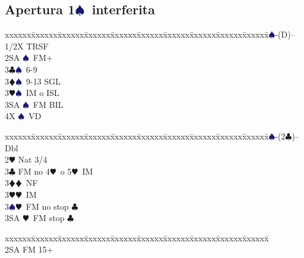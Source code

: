 \documentclass[a4paper,italian]{article}
\newcommand{\BC}{\textcolor{OliveGreen}{$\clubsuit$}}
\newcommand{\BD}{\textcolor{RedOrange}{$\vardiamondsuit$}}
\newcommand{\BH}{\textcolor{Red2}{$\varheartsuit${}}}
\newcommand{\BS}{\textcolor{MidnightBlue}{$\spadesuit${}}}
\newcommand{\pdfs}{\texorpdfstring{\BS{}}{S}}
\newenvironment{bidtable}
{\begin{tabbing}

    xxxxxx\=xxxxxx\=xxxxxx\=xxxxxx\=xxxxxx\=xxxxxx\=xxxxxx\=xxxxxx\=xxxxxx\=xxxxxx\=\kill}
{\end{tabbing} }%
\begin{document}
\begin{multicols}{2}
                                        \subsection{Apertura 1\pdfs\ interferita}
                                        \begin{bidtable}
                                            1\BS-(D)--\+\\
                                            1/2X \> TRSF\\
                                            2SA \BS\ FM+\\
                                            3\BC {}\BS\ 6-9\\
                                            3\BD {}\BS\ 9-13 SGL\\
                                            3\BH {}\BS\ IM o ISL\\
                                            3SA \BS\ FM BIL\\
                                            4X \BS\ VD\-
                                        \end{bidtable}
                                        \begin{bidtable}
                                            1\BS-(2\BC)--\+\\
                                            Dbl\+\\
                                            2\BH \> Nat 3/4\+\\
                                            3\BC \> FM no 4\BH\ o 5\BH\ IM\\
                                            3\BD {}\BD\ NF\\
                                            3\BH {}\BH\ IM\\
                                            3\BS {}\BH\ FM no stop \BC \\
                                            3SA \BH\ FM stop \BC \-\\
                                        \end{bidtable}
                                        \columnbreak
                                        \begin{bidtable}
                                            \+\+\\
                                            2SA \> FM 15+\+\\

\end{bidtable}
\end{multicols}
\end{document}

